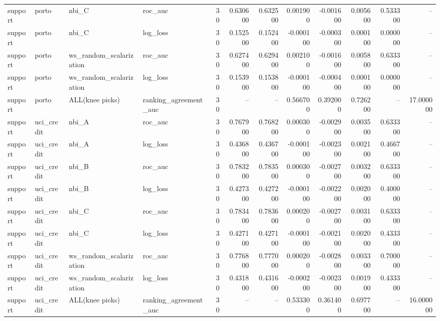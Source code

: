 \begin{landscape}
\begin{longtable}{llllrrrrrrrr}
support & porto & nbi\_C & roc\_auc & 30 & 0.630600 & 0.632500 & 0.001900 & -0.001600 & 0.005600 & 0.533300 & -- \\
support & porto & nbi\_C & log\_loss & 30 & 0.152500 & 0.152400 & -0.000100 & -0.000300 & 0.000100 & 0.000000 & -- \\
support & porto & ws\_random\_scalarization & roc\_auc & 30 & 0.627400 & 0.629400 & 0.002100 & -0.001600 & 0.005800 & 0.633300 & -- \\
support & porto & ws\_random\_scalarization & log\_loss & 30 & 0.153900 & 0.153800 & -0.000100 & -0.000400 & 0.000100 & 0.000000 & -- \\
support & porto & ALL(knee picks) & ranking\_agreement\_auc & 30 & -- & -- & 0.566700 & 0.392000 & 0.726200 & -- & 17.000000 \\
support & uci\_credit & nbi\_A & roc\_auc & 30 & 0.767900 & 0.768200 & 0.000300 & -0.002900 & 0.003500 & 0.633300 & -- \\
support & uci\_credit & nbi\_A & log\_loss & 30 & 0.436800 & 0.436700 & -0.000100 & -0.002300 & 0.002100 & 0.466700 & -- \\
support & uci\_credit & nbi\_B & roc\_auc & 30 & 0.783200 & 0.783500 & 0.000300 & -0.002700 & 0.003200 & 0.633300 & -- \\
support & uci\_credit & nbi\_B & log\_loss & 30 & 0.427300 & 0.427200 & -0.000100 & -0.002200 & 0.002000 & 0.400000 & -- \\
support & uci\_credit & nbi\_C & roc\_auc & 30 & 0.783400 & 0.783600 & 0.000200 & -0.002700 & 0.003100 & 0.633300 & -- \\
support & uci\_credit & nbi\_C & log\_loss & 30 & 0.427100 & 0.427100 & -0.000100 & -0.002100 & 0.002000 & 0.433300 & -- \\
support & uci\_credit & ws\_random\_scalarization & roc\_auc & 30 & 0.776800 & 0.777000 & 0.000200 & -0.002800 & 0.003300 & 0.700000 & -- \\
support & uci\_credit & ws\_random\_scalarization & log\_loss & 30 & 0.431800 & 0.431600 & -0.000200 & -0.002300 & 0.001900 & 0.433300 & -- \\
support & uci\_credit & ALL(knee picks) & ranking\_agreement\_auc & 30 & -- & -- & 0.533300 & 0.361400 & 0.697700 & -- & 16.000000 \\
\end{longtable}\endgroup\addtocounter{table}{-1}

\end{landscape}
